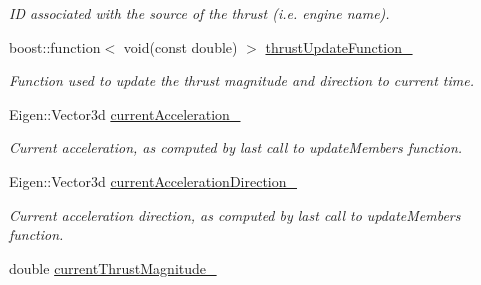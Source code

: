 \begin{DoxyCompactItemize}
\begin{DoxyCompactList}\small\item\em ID associated with the source of the thrust (i.\+e. engine name). \end{DoxyCompactList}\item 
boost\+::function$<$ void(const double) $>$ \hyperlink{classtudat_1_1propulsion_1_1ThrustAcceleration_a9b45c3519c38d2a78e85f04f1f2730b7}{thrust\+Update\+Function\+\_\+}\hypertarget{classtudat_1_1propulsion_1_1ThrustAcceleration_a9b45c3519c38d2a78e85f04f1f2730b7}{}\label{classtudat_1_1propulsion_1_1ThrustAcceleration_a9b45c3519c38d2a78e85f04f1f2730b7}

\begin{DoxyCompactList}\small\item\em Function used to update the thrust magnitude and direction to current time. \end{DoxyCompactList}\item 
Eigen\+::\+Vector3d \hyperlink{classtudat_1_1propulsion_1_1ThrustAcceleration_aae924d2a7c3d42770e3f5cbe5ce9273d}{current\+Acceleration\+\_\+}\hypertarget{classtudat_1_1propulsion_1_1ThrustAcceleration_aae924d2a7c3d42770e3f5cbe5ce9273d}{}\label{classtudat_1_1propulsion_1_1ThrustAcceleration_aae924d2a7c3d42770e3f5cbe5ce9273d}

\begin{DoxyCompactList}\small\item\em Current acceleration, as computed by last call to update\+Members function. \end{DoxyCompactList}\item 
Eigen\+::\+Vector3d \hyperlink{classtudat_1_1propulsion_1_1ThrustAcceleration_aaac3ca9b08854671faa09b94f59fef4d}{current\+Acceleration\+Direction\+\_\+}\hypertarget{classtudat_1_1propulsion_1_1ThrustAcceleration_aaac3ca9b08854671faa09b94f59fef4d}{}\label{classtudat_1_1propulsion_1_1ThrustAcceleration_aaac3ca9b08854671faa09b94f59fef4d}

\begin{DoxyCompactList}\small\item\em Current acceleration direction, as computed by last call to update\+Members function. \end{DoxyCompactList}\item 
double \hyperlink{classtudat_1_1propulsion_1_1ThrustAcceleration_a0811cf5df46ed03cf7fabb9eda5ba101}{current\+Thrust\+Magnitude\+\_\+}\hypertarget{classtudat_1_1propulsion_1_1ThrustAcceleration_a0811cf5df46ed03cf7fabb9eda5ba101}{}\label{classtudat_1_1propulsion_1_1ThrustAcceleration_a0811cf5df46ed03cf7fabb9eda5ba101}


\end{DoxyCompactItemize}
